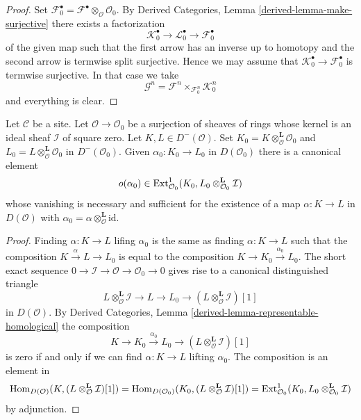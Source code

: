 \begin{proof}
Set $\mathcal{F}_0^\bullet =
\mathcal{F}^\bullet \otimes_\mathcal{O} \mathcal{O}_0$.
By Derived Categories, Lemma \ref{derived-lemma-make-surjective}
there exists a factorization
$$
\mathcal{K}_0^\bullet \to \mathcal{L}_0^\bullet \to \mathcal{F}_0^\bullet
$$
of the given map such that the first arrow has an inverse up
to homotopy and the second arrow is termwise split surjective.
Hence we may assume that $\mathcal{K}_0^\bullet \to \mathcal{F}_0^\bullet$
is termwise surjective.
In that case we take
$$
\mathcal{G}^n = \mathcal{F}^n \times_{\mathcal{F}^n_0} \mathcal{K}_0^n
$$
and everything is clear.
\end{proof}

\begin{lemma}
\label{lemma-inf-obs-map-defo-complex}
Let $\mathcal{C}$ be a site. Let $\mathcal{O} \to \mathcal{O}_0$
be a surjection of sheaves of rings whose kernel is an ideal sheaf
$\mathcal{I}$ of square zero. Let $K, L \in D^-(\mathcal{O})$.
Set $K_0 = K \otimes_\mathcal{O}^\mathbf{L} \mathcal{O}_0$
and $L_0 = L \otimes_\mathcal{O}^\mathbf{L} \mathcal{O}_0$
in $D^-(\mathcal{O}_0)$. Given $\alpha_0 : K_0 \to L_0$ in $D(\mathcal{O}_0)$
there is a canonical element
$$
o(\alpha_0) \in \mathop{\mathrm{Ext}}\nolimits^1_{\mathcal{O}_0}(K_0,
L_0 \otimes_{\mathcal{O}_0}^\mathbf{L} \mathcal{I})
$$
whose vanishing is necessary and sufficient for the
existence of a map $\alpha : K \to L$ in $D(\mathcal{O})$
with $\alpha_0 = \alpha \otimes_\mathcal{O}^\mathbf{L} \text{id}$.
\end{lemma}

\begin{proof}
Finding $\alpha : K \to L$ lifing $\alpha_0$ is the same as finding
$\alpha : K \to L$ such that the composition $K \xrightarrow{\alpha} L \to L_0$
is equal to the composition $K \to K_0 \xrightarrow{\alpha_0} L_0$.
The short exact sequence
$0 \to \mathcal{I} \to \mathcal{O} \to \mathcal{O}_0 \to 0$
gives rise to a canonical distinguished triangle
$$
L \otimes_\mathcal{O}^\mathbf{L} \mathcal{I} \to
L \to
L_0 \to
(L \otimes_\mathcal{O}^\mathbf{L} \mathcal{I})[1]
$$
in $D(\mathcal{O})$.
By Derived Categories, Lemma \ref{derived-lemma-representable-homological}
the composition
$$
K \to K_0 \xrightarrow{\alpha_0} L_0 \to
(L \otimes_\mathcal{O}^\mathbf{L} \mathcal{I})[1]
$$
is zero if and only if we can find $\alpha : K \to L$
lifting $\alpha_0$. The composition is an element in
$$
\mathop{\mathrm{Hom}}\nolimits_{D(\mathcal{O})}(K, (L \otimes_\mathcal{O}^\mathbf{L} \mathcal{I})[1]) =
\mathop{\mathrm{Hom}}\nolimits_{D(\mathcal{O}_0)}(K_0,
(L \otimes_\mathcal{O}^\mathbf{L} \mathcal{I})[1]) =
\mathop{\mathrm{Ext}}\nolimits^1_{\mathcal{O}_0}(K_0,
L_0 \otimes_{\mathcal{O}_0}^\mathbf{L} \mathcal{I})
$$
by adjunction.
\end{proof}

